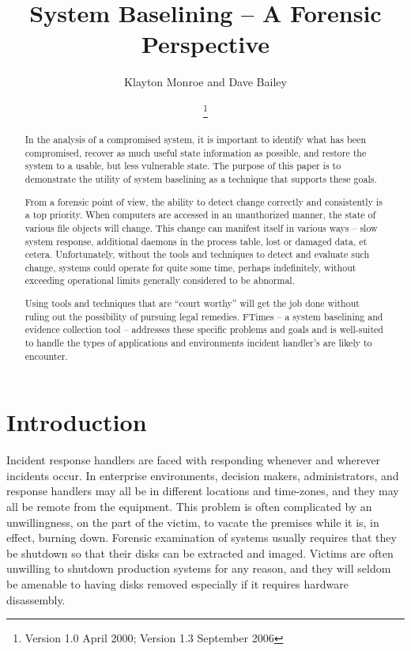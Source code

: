 \documentclass[10pt]{article}
\title{\Large\bf System Baselining -- A Forensic Perspective}
\author{Klayton Monroe and Dave Bailey}
\date{\VersionString\thanks{Version 1.0 April 2000; Version 1.3 September 2006}}
\begin{document}
\maketitle

\begin{abstract}

In the analysis of a compromised system, it is important to identify
what has been compromised, recover as much useful state information as
possible, and restore the system to a usable, but less vulnerable
state.  The purpose of this paper is to demonstrate the utility of
system baselining as a technique that supports these goals.

From a forensic point of view, the ability to detect change correctly
and consistently is a top priority.  When computers are accessed in an
unauthorized manner, the state of various file objects will change.
This change can manifest itself in various ways -- slow system
response, additional daemons in the process table, lost or damaged
data, et cetera.  Unfortunately, without the tools and techniques to
detect and evaluate such change, systems could operate for quite some
time, perhaps indefinitely, without exceeding operational limits
generally considered to be abnormal.

Using tools and techniques that are ``court worthy'' will get the job
done without ruling out the possibility of pursuing legal remedies.
FTimes -- a system baselining and evidence collection tool --
addresses these specific problems and goals and is well-suited to
handle the types of applications and environments incident handler's
are likely to encounter.

\end{abstract}

\section{Introduction}

Incident response handlers are faced with responding whenever and
wherever incidents occur.  In enterprise environments,
decision makers, administrators, and response handlers may all be in
different locations and time-zones, and they may all be remote from
the equipment.  This problem is often complicated by an unwillingness,
on the part of the victim, to vacate the premises while it is, in
effect, burning down.  Forensic examination of systems usually
requires that they be shutdown so that their disks can be extracted
and imaged.  Victims are often unwilling to shutdown production
systems for any reason, and they will seldom be amenable to having
disks removed especially if it requires hardware disassembly.
\end{document}
